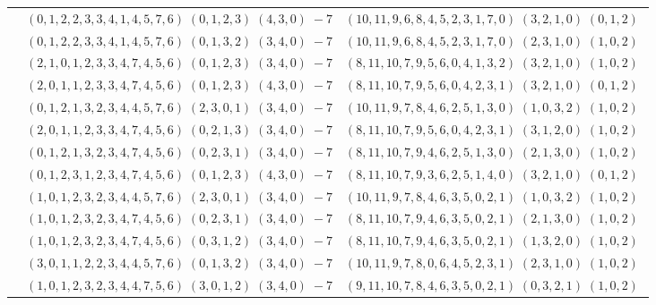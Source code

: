\documentclass[11pt]{article}
\begin{document}
\begin{longtable}[l]{|c|c|c|}
 \cline{2-3} 
 & $(0 ,1 ,2 ,2 ,3 ,3 ,4 ,1 ,4 ,5 ,7 ,6) \;(0 ,1 ,2 ,3) \;(4 ,3 ,0) \;-7$ & $(10 ,11 ,9 ,6 ,8 ,4 ,5 ,2 ,3 ,1 ,7 ,0) \;(3 ,2 ,1 ,0) \;(0 ,1 ,2) \;$\\ 
 \cline{2-3} 
 & $(0 ,1 ,2 ,2 ,3 ,3 ,4 ,1 ,4 ,5 ,7 ,6) \;(0 ,1 ,3 ,2) \;(3 ,4 ,0) \;-7$ & $(10 ,11 ,9 ,6 ,8 ,4 ,5 ,2 ,3 ,1 ,7 ,0) \;(2 ,3 ,1 ,0) \;(1 ,0 ,2) \;$\\ 
 \cline{2-3} 
 & $(2 ,1 ,0 ,1 ,2 ,3 ,3 ,4 ,7 ,4 ,5 ,6) \;(0 ,1 ,2 ,3) \;(3 ,4 ,0) \;-7$ & $(8 ,11 ,10 ,7 ,9 ,5 ,6 ,0 ,4 ,1 ,3 ,2) \;(3 ,2 ,1 ,0) \;(1 ,0 ,2) \;$\\ 
 \cline{2-3} 
 & $(2 ,0 ,1 ,1 ,2 ,3 ,3 ,4 ,7 ,4 ,5 ,6) \;(0 ,1 ,2 ,3) \;(4 ,3 ,0) \;-7$ & $(8 ,11 ,10 ,7 ,9 ,5 ,6 ,0 ,4 ,2 ,3 ,1) \;(3 ,2 ,1 ,0) \;(0 ,1 ,2) \;$\\ 
 \cline{2-3} 
 & $(0 ,1 ,2 ,1 ,3 ,2 ,3 ,4 ,4 ,5 ,7 ,6) \;(2 ,3 ,0 ,1) \;(3 ,4 ,0) \;-7$ & $(10 ,11 ,9 ,7 ,8 ,4 ,6 ,2 ,5 ,1 ,3 ,0) \;(1 ,0 ,3 ,2) \;(1 ,0 ,2) \;$\\ 
 \cline{2-3} 
 & $(2 ,0 ,1 ,1 ,2 ,3 ,3 ,4 ,7 ,4 ,5 ,6) \;(0 ,2 ,1 ,3) \;(3 ,4 ,0) \;-7$ & $(8 ,11 ,10 ,7 ,9 ,5 ,6 ,0 ,4 ,2 ,3 ,1) \;(3 ,1 ,2 ,0) \;(1 ,0 ,2) \;$\\ 
 \cline{2-3} 
 & $(0 ,1 ,2 ,1 ,3 ,2 ,3 ,4 ,7 ,4 ,5 ,6) \;(0 ,2 ,3 ,1) \;(3 ,4 ,0) \;-7$ & $(8 ,11 ,10 ,7 ,9 ,4 ,6 ,2 ,5 ,1 ,3 ,0) \;(2 ,1 ,3 ,0) \;(1 ,0 ,2) \;$\\ 
 \cline{2-3} 
 & $(0 ,1 ,2 ,3 ,1 ,2 ,3 ,4 ,7 ,4 ,5 ,6) \;(0 ,1 ,2 ,3) \;(4 ,3 ,0) \;-7$ & $(8 ,11 ,10 ,7 ,9 ,3 ,6 ,2 ,5 ,1 ,4 ,0) \;(3 ,2 ,1 ,0) \;(0 ,1 ,2) \;$\\ 
 \cline{2-3} 
 & $(1 ,0 ,1 ,2 ,3 ,2 ,3 ,4 ,4 ,5 ,7 ,6) \;(2 ,3 ,0 ,1) \;(3 ,4 ,0) \;-7$ & $(10 ,11 ,9 ,7 ,8 ,4 ,6 ,3 ,5 ,0 ,2 ,1) \;(1 ,0 ,3 ,2) \;(1 ,0 ,2) \;$\\ 
 \cline{2-3} 
 & $(1 ,0 ,1 ,2 ,3 ,2 ,3 ,4 ,7 ,4 ,5 ,6) \;(0 ,2 ,3 ,1) \;(3 ,4 ,0) \;-7$ & $(8 ,11 ,10 ,7 ,9 ,4 ,6 ,3 ,5 ,0 ,2 ,1) \;(2 ,1 ,3 ,0) \;(1 ,0 ,2) \;$\\ 
 \cline{2-3} 
 & $(1 ,0 ,1 ,2 ,3 ,2 ,3 ,4 ,7 ,4 ,5 ,6) \;(0 ,3 ,1 ,2) \;(3 ,4 ,0) \;-7$ & $(8 ,11 ,10 ,7 ,9 ,4 ,6 ,3 ,5 ,0 ,2 ,1) \;(1 ,3 ,2 ,0) \;(1 ,0 ,2) \;$\\ 
 \cline{2-3} 
 & $(3 ,0 ,1 ,1 ,2 ,2 ,3 ,4 ,4 ,5 ,7 ,6) \;(0 ,1 ,3 ,2) \;(3 ,4 ,0) \;-7$ & $(10 ,11 ,9 ,7 ,8 ,0 ,6 ,4 ,5 ,2 ,3 ,1) \;(2 ,3 ,1 ,0) \;(1 ,0 ,2) \;$\\ 
 \cline{2-3} 
 & $(1 ,0 ,1 ,2 ,3 ,2 ,3 ,4 ,4 ,7 ,5 ,6) \;(3 ,0 ,1 ,2) \;(3 ,4 ,0) \;-7$ & $(9 ,11 ,10 ,7 ,8 ,4 ,6 ,3 ,5 ,0 ,2 ,1) \;(0 ,3 ,2 ,1) \;(1 ,0 ,2) \;$\\ 

\end{longtable}
\end{document}
